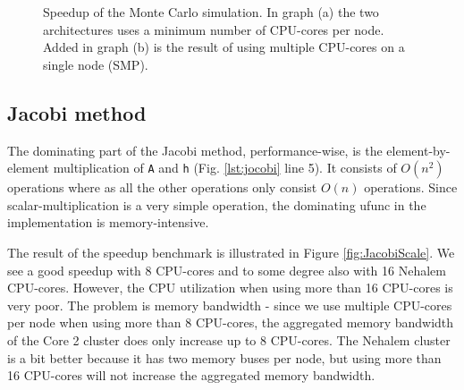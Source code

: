 \documentclass{sigplanconf}
\begin{document}
\begin{figure}[t]%
  \begin{center}%
    \caption{Speedup of the Monte Carlo simulation. In graph (a) the two architectures uses a minimum number of CPU-cores per node. Added in graph (b) is the result of using multiple CPU-cores on a single node (SMP).}%
    \label{fig:MonteCarlo}%
  \end{center}
\end{figure}


\subsection{Jacobi method}
The dominating part of the Jacobi method, performance-wise, is the element-by-element multiplication of \texttt{A} and \texttt{h} (Fig. \ref{lst:jocobi} line 5). It consists of $O(n^2)$ operations where as all the other operations only consist $O(n)$ operations. Since scalar-multiplication is a very simple operation, the dominating ufunc in the implementation is memory-intensive.

The result of the speedup benchmark is illustrated in Figure \ref{fig:JacobiScale}. We see a good speedup with 8 CPU-cores and to some degree also with 16 Nehalem CPU-cores. However, the CPU utilization when using more than 16 CPU-cores is very poor. The problem is memory bandwidth - since we use multiple CPU-cores per node when using more than 8 CPU-cores, the aggregated memory bandwidth of the Core 2 cluster does only increase up to 8 CPU-cores. The Nehalem cluster is a bit better because it has two memory buses per node, but using more than 16 CPU-cores will not increase the aggregated memory bandwidth.
\end{document}
